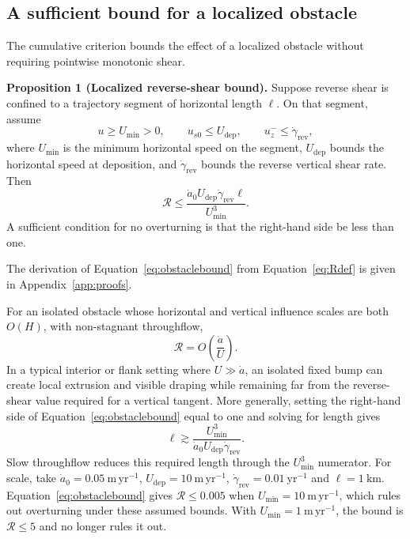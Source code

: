 \documentclass[review]{igs}
\begin{document}
\subsection{A sufficient bound for a localized obstacle}

The cumulative criterion bounds the effect of a localized obstacle without requiring pointwise monotonic shear.

\medskip
\noindent\textbf{Proposition 1 (Localized reverse-shear bound).}
Suppose reverse shear is confined to a trajectory segment of horizontal length \(\ell\). On that segment, assume
\begin{equation}
 u\geq U_{\min}>0,
 \qquad
 u_{s0}\leq U_{\mathrm{dep}},
 \qquad
 u_z^-\leq \dot\gamma_{\mathrm{rev}},
\label{eq:boundassumptions}
\end{equation}
where \(U_{\min}\) is the minimum horizontal speed on the segment, \(U_{\mathrm{dep}}\) bounds the horizontal speed at deposition, and \(\dot\gamma_{\mathrm{rev}}\) bounds the reverse vertical shear rate. Then
\begin{equation}
\mathcal{R}\leq
\frac{\dot a_0U_{\mathrm{dep}}\dot\gamma_{\mathrm{rev}}\ell}
{U_{\min}^{3}}.
\label{eq:obstaclebound}
\end{equation}
A sufficient condition for no overturning is that the right-hand side be less than one.

The derivation of Equation~\ref{eq:obstaclebound} from Equation~\ref{eq:Rdef} is given in Appendix~\ref{app:proofs}.

For an isolated obstacle whose horizontal and vertical influence scales are both \(O(H)\), with non-stagnant throughflow,
\begin{equation}
\mathcal{R}=O\!\left(\frac{\dot a}{U}\right).
\label{eq:isolatedscale}
\end{equation}
In a typical interior or flank setting where \(U\gg\dot a\), an isolated fixed bump can create local extrusion and visible draping while remaining far from the reverse-shear value required for a vertical tangent. More generally, setting the right-hand side of Equation~\ref{eq:obstaclebound} equal to one and solving for length gives
\begin{equation}
\ell
\gtrsim
\frac{U_{\min}^{3}}
{\dot a_0U_{\mathrm{dep}}\dot\gamma_{\mathrm{rev}}}.
\label{eq:lengththreshold}
\end{equation}
Slow throughflow reduces this required length through the \(U_{\min}^{3}\) numerator. For scale, take \(\dot a_0=0.05~\mathrm{m\,yr^{-1}}\), \(U_{\mathrm{dep}}=10~\mathrm{m\,yr^{-1}}\), \(\dot\gamma_{\mathrm{rev}}=0.01~\mathrm{yr^{-1}}\) and \(\ell=1~\mathrm{km}\). Equation~\ref{eq:obstaclebound} gives \(\mathcal{R}\leq0.005\) when \(U_{\min}=10~\mathrm{m\,yr^{-1}}\), which rules out overturning under these assumed bounds. With \(U_{\min}=1~\mathrm{m\,yr^{-1}}\), the bound is \(\mathcal{R}\leq5\) and no longer rules it out.
\end{document}
